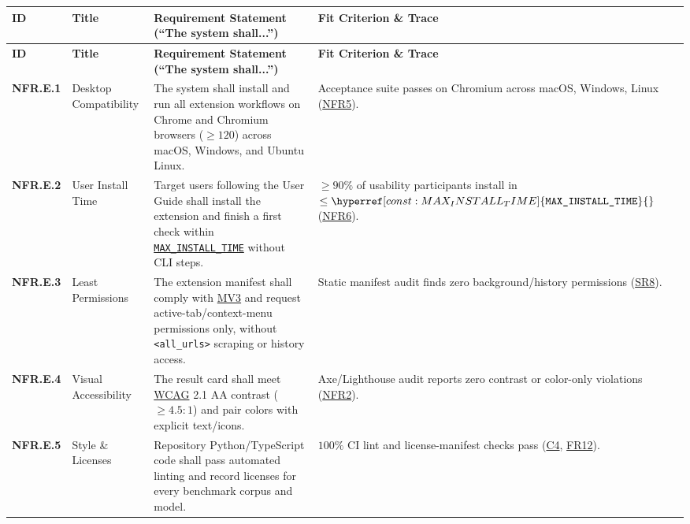 \documentclass[11pt]{article}
\newcommand{\MaxInstallTime}{\hyperref[const:MAX_INSTALL_TIME]{\texttt{MAX\_\allowbreak{}INSTALL\_\allowbreak{}TIME}}}
\newcommand{\MVThree}{\hyperlink{acr-mv3}{MV3}}
\newcommand{\WCAG}{\hyperlink{acr-wcag}{WCAG}}
\begin{document}
{\small
\setlength{\tabcolsep}{4pt}
\renewcommand{\arraystretch}{0.96}
\begin{tabularx}{\textwidth}{l P{2.8cm} Y P{3.4cm}}
\caption{Environmental, Installability, and Compliance Requirements} \label{TblEnvReqs}\\
\toprule
\textbf{ID} & \textbf{Title} & \textbf{Requirement Statement (``The system shall...'')} & \textbf{Fit Criterion \& Trace}\\
\midrule
\endfirsthead
\toprule
\textbf{ID} & \textbf{Title} & \textbf{Requirement Statement (``The system shall...'')} & \textbf{Fit Criterion \& Trace}\\
\midrule
\endhead
\bottomrule
\endfoot
{}\label{NFR.E.1}\textbf{NFR.E.1} & Desktop Compatibility & The system shall install and run all extension workflows on Chrome and Chromium browsers ($\ge 120$) across macOS, Windows, and Ubuntu Linux. & Acceptance suite passes on Chromium across macOS, Windows, Linux (\hyperref[NFR5]{NFR5}).\\
\midrule
{}\label{NFR.E.2}\textbf{NFR.E.2} & User Install Time & Target users following the User Guide shall install the extension and finish a first check within \MaxInstallTime{} without CLI steps. & $\ge 90\%$ of usability participants install in $\le \MaxInstallTime{}$ (\hyperref[NFR6]{NFR6}).\\
\midrule
{}\label{NFR.E.3}\textbf{NFR.E.3} & Least Permissions & The extension manifest shall comply with \MVThree{} and request active-tab/context-menu permissions only, without \texttt{<all\_\allowbreak{}urls>} scraping or history access. & Static manifest audit finds zero background/history permissions (\hyperref[SR8]{SR8}).\\
\midrule
{}\label{NFR.E.4}\textbf{NFR.E.4} & Visual Accessibility & The result card shall meet \WCAG{} 2.1 AA contrast ($\ge 4.5:1$) and pair colors with explicit text/icons. & Axe/Lighthouse audit reports zero contrast or color-only violations (\hyperref[NFR2]{NFR2}).\\
\midrule
{}\label{NFR.E.5}\textbf{NFR.E.5} & Style \& Licenses & Repository Python/TypeScript code shall pass automated linting and record licenses for every benchmark corpus and model. & $100\%$ CI lint and license-manifest checks pass (\hyperref[C4]{C4}, \hyperref[FR12]{FR12}).\\
\end{tabularx}
}

\newpage

\end{document}
